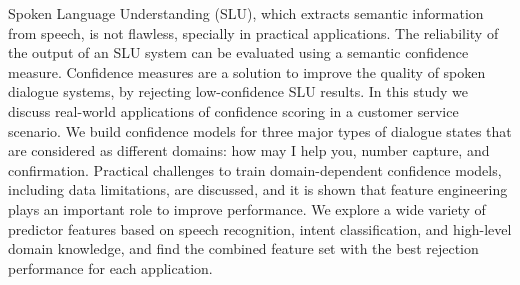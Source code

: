 Spoken Language Understanding (SLU), which extracts semantic information from speech, is not flawless, specially in practical applications. The reliability of the output of an SLU system can be evaluated using a semantic confidence measure. Confidence measures are a solution to improve the quality of spoken dialogue systems, by rejecting low-confidence SLU results. In this study we discuss real-world applications of confidence scoring in a customer service scenario. We build confidence models for three major types of dialogue states that are considered as different domains: how may I help you, number capture, and confirmation. Practical challenges to train domain-dependent confidence models, including data limitations, are discussed, and it is shown that feature engineering plays an important role to improve performance.  We explore a wide variety of predictor features based on speech recognition, intent classification, and high-level domain knowledge, and find the combined feature set with the best rejection performance for each application.
